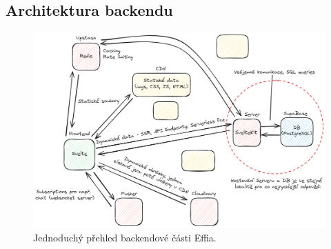 \documentclass[12pt, a4paper,
openright
]{report}
\begin{document}
\subsection{Architektura backendu}
\begin{figure}[h!]
	\centering %
	\includegraphics[width=1\linewidth]{image/effio-architecture.png} 
	\caption{Jednoduchý přehled backendové části Effia.} %
	\label{fig:effio-architecture} %
\end{figure}
\end{document}
